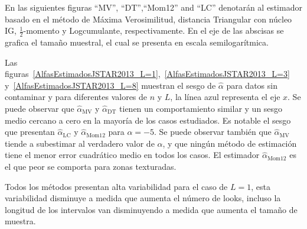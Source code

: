 En las siguientes figuras ``MV'', ``DT'',``Mom12'' and ``LC'' denotarán al estimador basado en el método de Máxima Verosimilitud, distancia Triangular con núcleo IG, $\frac{1}{2}$-momento y Logcumulante, respectivamente. En el eje de las abscisas se grafica el tamaño muestral, el cual se presenta en escala semilogarítmica.

Las figuras~\ref{AlfasEstimadosJSTAR2013_L=1},~\ref{AlfasEstimadosJSTAR2013_L=3} y~\ref{AlfasEstimadosJSTAR2013_L=8} muestran el sesgo de $\widehat{\alpha}$ para datos sin contaminar y para diferentes valores de $n$ y $L$, la línea azul representa el eje $x$. Se puede observar que $\widehat{\alpha}_{\text{MV}}$ y $\widehat{\alpha}_{\text{DT}}$ tienen un comportamiento similar y un sesgo medio cercano a cero en la mayoría de los casos estudiados. Es notable el sesgo que presentan  $\widehat{\alpha}_{\text{LC}}$ y $\widehat{\alpha}_{\text{Mom12}}$ para $\alpha=-5$. Se puede observar también que $\widehat\alpha_{\text{MV}}$ tiende a subestimar al verdadero valor de $\alpha$, y que ningún método de estimación tiene el menor error cuadrático medio en todos los casos. El estimador $\widehat{\alpha}_{\text{Mom12}}$ es el que peor se comporta para zonas texturadas.

Todos los métodos presentan alta variabilidad para el caso de $L=1$, esta variabilidad disminuye a medida que aumenta el número de looks, incluso la longitud de los intervalos van disminuyendo a medida que aumenta el tamaño de muestra.

